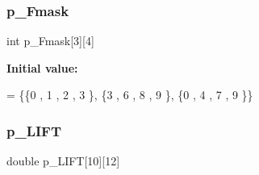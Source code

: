 \subsubsection{\texorpdfstring{p\+\_\+\+Fmask}{p\_Fmask}}
{\footnotesize\ttfamily int p\+\_\+\+Fmask\mbox{[}3\mbox{]}\mbox{[}4\mbox{]}}

{\bfseries Initial value\+:}
\begin{DoxyCode}
= \{\{0 , 1 , 2 , 3 \},
\{3 , 6 , 8 , 9 \},
\{0 , 4 , 7 , 9 \}\}
\end{DoxyCode}
\mbox{\label{a00512_aefff047c0c87461150b141f54f837e81}} 
\subsubsection{\texorpdfstring{p\+\_\+\+L\+I\+FT}{p\_LIFT}}
{\footnotesize\ttfamily double p\+\_\+\+L\+I\+FT\mbox{[}10\mbox{]}\mbox{[}12\mbox{]}}

